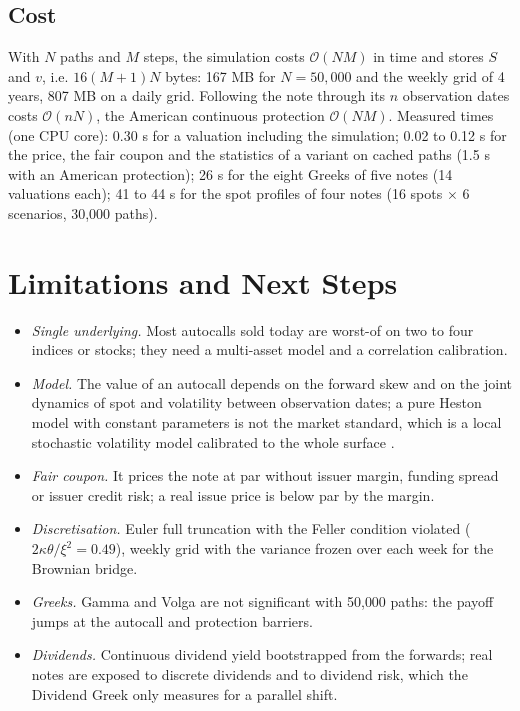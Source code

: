 \documentclass[11pt,a4paper]{article}
\begin{document}
\subsection{Cost}
With $N$ paths and $M$ steps, the simulation costs $\mathcal{O}(NM)$ in time and stores $S$ and $v$, i.e.
$16(M+1)N$ bytes: 167 MB for $N = 50{,}000$ and the weekly grid of 4 years, 807 MB on a daily grid. Following the
note through its $n$ observation dates costs $\mathcal{O}(nN)$, the American continuous protection
$\mathcal{O}(NM)$. Measured times (one CPU core): 0.30 s for a valuation including the simulation; 0.02 to 0.12 s
for the price, the fair coupon and the statistics of a variant on cached paths (1.5 s with an American
protection); 26 s for the eight Greeks of five notes (14 valuations each); 41 to 44 s for the spot profiles of
four notes (16 spots $\times$ 6 scenarios, 30{,}000 paths).

\section{Limitations and Next Steps}\label{sec:limitations}
\begin{itemize}
\item \emph{Single underlying.} Most autocalls sold today are worst-of on two to four indices or stocks; they need
a multi-asset model and a correlation calibration.
\item \emph{Model.} The value of an autocall depends on the forward skew and on the joint dynamics of spot and
volatility between observation dates; a pure Heston model with constant parameters is not the market standard,
which is a local stochastic volatility model calibrated to the whole surface \cite{bergomi2016}.
\item \emph{Fair coupon.} It prices the note at par without issuer margin, funding spread or issuer credit risk; a
real issue price is below par by the margin.
\item \emph{Discretisation.} Euler full truncation with the Feller condition violated ($2\kappa\theta/\xi^2 = 0.49$),
weekly grid with the variance frozen over each week for the Brownian bridge.
\item \emph{Greeks.} Gamma and Volga are not significant with 50{,}000 paths: the payoff jumps at the autocall and
protection barriers.
\item \emph{Dividends.} Continuous dividend yield bootstrapped from the forwards; real notes are exposed to
discrete dividends and to dividend risk, which the Dividend Greek only measures for a parallel shift.
\end{itemize}
\end{document}
